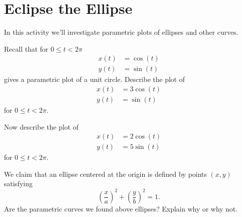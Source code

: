 
\newpage
\section{Eclipse the Ellipse}

In this activity we'll investigate parametric plots of ellipses and
other curves.

\begin{prob} 
Recall that for $0\le t<2\pi$ 
\begin{align*}
x(t) &= \cos(t)\\ 
y(t) &= \sin(t)
\end{align*}
gives a parametric plot of a unit circle. Describe the plot of
\begin{align*}
x(t) &= 3\cos(t)\\ 
y(t) &= \sin(t)
\end{align*}
for $0\le t<2\pi$.
\end{prob} 

\begin{prob}
Now describe the plot of 
\begin{align*}
x(t) &= 2\cos(t)\\ 
y(t) &= 5\sin(t)
\end{align*}
for $0\le t<2\pi$.
\end{prob}

\begin{prob}
We claim that an ellipse centered at the origin is defined by points
$(x,y)$ satisfying
\[
\left(\frac{x}{a}\right)^2 + \left(\frac{y}{b}\right)^2 = 1.
\]
Are the parametric curves we found above ellipses? Explain why or why
not. 
\end{prob}

\newpage


